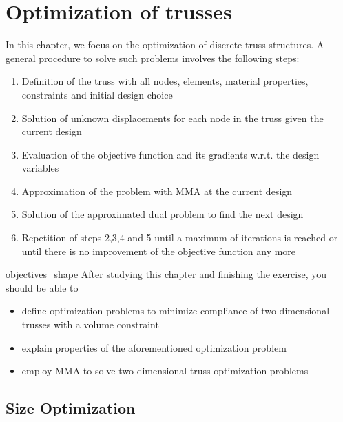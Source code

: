 \chapter{Optimization of trusses}
In this chapter, we focus on the optimization of discrete truss structures. A general procedure to solve such problems involves the following steps:
\begin{enumerate}
    \item Definition of the truss with all nodes, elements, material properties, constraints and initial design choice
    \item Solution of unknown displacements for each node in the truss given the current design
    \item Evaluation of the objective function and its gradients w.r.t. the design variables
    \item Approximation of the problem with MMA at the current design
    \item Solution of the approximated dual problem to find the next design
    \item Repetition of steps 2,3,4 and 5 until a maximum of iterations is reached or until there is no improvement of the objective function any more
\end{enumerate}


\begin{objectives}{}{objectives_shape}
After studying this chapter and finishing the exercise, you should be able to 
\begin{itemize}[label=$\dots$]
    \item define optimization problems to minimize compliance of two-dimensional trusses with a volume constraint
    \item explain properties of the aforementioned optimization problem
    \item employ MMA to solve two-dimensional truss optimization problems
\end{itemize}
\end{objectives}

\section{Size Optimization}

